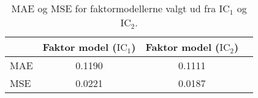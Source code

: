 \begin{table}
\center
\begin{tabular}{lccc}
\toprule
& Faktor model ($\text{IC}_1$) & Faktor model ($\text{IC}_2$)  \\
\midrule 
MAE & 0.1190 & 0.1111 \\ 
MSE &  0.0221  & 0.0187 \\ \bottomrule
 \end{tabular}
\caption{MAE og MSE for faktormodellerne valgt ud fra IC\(_1\) og IC\(_2\).} \label{tab:factor_mse_tab}
\end{table}